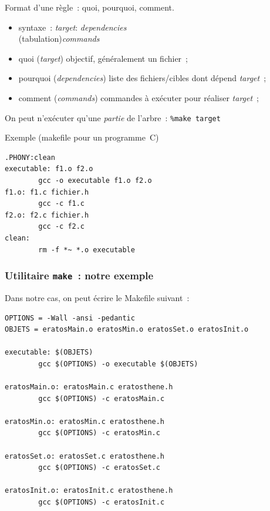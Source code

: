 \begin{frame}[fragile]
Format d'une r\`egle~: quoi, pourquoi, comment.
\begin{itemize}
\item syntaxe~:
  \hspace*{10mm} {\it target}: {\it dependencies}\\
\hspace*{25mm} (tabulation){\it commands}
  \item\alert{quoi} ({\it target}) objectif, g\'en\'eralement un fichier~;
  \item\alert{pourquoi} ({\it dependencies}) liste des
    fichiers/cibles dont d\'epend {\it target}~;
  \item\alert{comment} ({\it commands}) commandes \`a ex\'ecuter pour r\'ealiser   
    {\it target}~;
\end{itemize}
On peut n'ex\'ecuter qu'une \textit{partie} de l'arbre~: \verb?%make target?
 \par
 Exemple (makefile pour un programme~C)
\begin{verbatim}
.PHONY:clean
executable: f1.o f2.o
        gcc -o executable f1.o f2.o
f1.o: f1.c fichier.h
        gcc -c f1.c
f2.o: f2.c fichier.h
        gcc -c f2.c
clean:
        rm -f *~ *.o executable
\end{verbatim}
\end{frame}
\begin{frame}[fragile]
  \frametitle{Utilitaire {\tt make}~: notre exemple}
Dans notre cas, on peut \'ecrire le Makefile suivant~:
\begin{verbatim}
OPTIONS = -Wall -ansi -pedantic
OBJETS = eratosMain.o eratosMin.o eratosSet.o eratosInit.o

executable: $(OBJETS)
        gcc $(OPTIONS) -o executable $(OBJETS)

eratosMain.o: eratosMain.c eratosthene.h
        gcc $(OPTIONS) -c eratosMain.c

eratosMin.o: eratosMin.c eratosthene.h
        gcc $(OPTIONS) -c eratosMin.c

eratosSet.o: eratosSet.c eratosthene.h
        gcc $(OPTIONS) -c eratosSet.c

eratosInit.o: eratosInit.c eratosthene.h
        gcc $(OPTIONS) -c eratosInit.c
\end{verbatim}
\end{frame}
